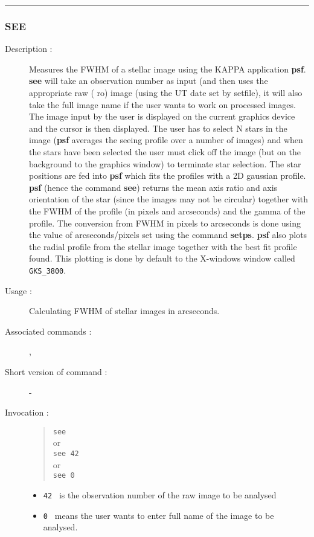 \hrule 
\subsubsection*{\label{SEE}SEE}

\begin{description}

\item[Description :] Measures the FWHM of a stellar image
using the KAPPA application {\bf psf}.  {\bf see} will take an
observation number as input (and then uses the appropriate raw ({\sc
ro}) image (using the UT date set by setfile), it will also take the
full image name if the user wants to work on processed images.  The
image input by the user is displayed on the current graphics device and
the cursor is then displayed.  The user has to select N stars in the
image ({\bf psf} averages the seeing profile over a number of images)
and when the stars have been selected the user must click off the image
(but on the background to the graphics window) to terminate star
selection.  The star positions are fed into {\bf psf} which fits the
profiles with a 2D gaussian profile.  {\bf psf} (hence the command {\bf see})
returns the mean axis ratio and axis orientation of the star (since the
images may not be circular) together with the FWHM of the profile (in
pixels and arcseconds) and the gamma of the profile. The conversion
from FWHM in pixels to arcseconds is done using the value of
arcseconds/pixels set using the command {\bf setps}.  {\bf psf} also plots
the radial profile from the stellar image together with the best fit
profile found.  This plotting is done by default to the X-windows
window called {\tt GKS\_3800}.

\item[Usage :] Calculating FWHM of stellar images in arcseconds.

\item[Associated commands :] {\tt {}}, 
{\tt {}}

\item[Short version of command :] -
\item[Invocation :]

\begin{quote}{\tt  see }\\
or \\
{\tt see 42 }\\
or \\ 
{\tt see 0 }
\end{quote}

\begin{itemize}
\item {\tt 42 } is the observation number of the raw image to be analysed
\item {\tt 0 } means the user wants to enter full name of the image to
 be analysed.
\end{itemize}

\end{description}

